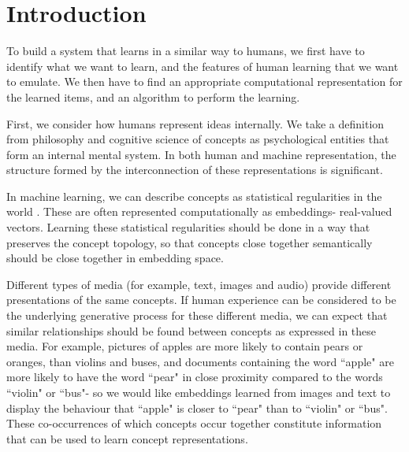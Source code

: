 \chapter{Introduction}

To build a system that learns in a similar way to humans, we first have to identify what we want to learn, and the features of human learning that we want to emulate. We then have to find an appropriate computational representation for the learned items, and an algorithm to perform the learning. 

First, we consider how humans represent ideas internally. We take a definition from philosophy \cite{stanfordconcepts}  and cognitive science  \cite{Pinker2007} of concepts as psychological entities that form an internal mental system. In both human and machine representation, the structure formed by the interconnection of these representations is significant. 


In machine learning, we can describe concepts as statistical regularities in the world \cite{RoadsLoveNatureMachineIntelligence}. These are often represented computationally as embeddings- real-valued vectors. Learning these statistical regularities should be done in a way that preserves the concept topology, so that concepts close together semantically should be close together in embedding space. 

Different types of media (for example, text, images and audio) provide different presentations of the same concepts. If human experience can be considered to be the underlying generative process for these different media, we can expect that similar relationships should be found between concepts as expressed in these media. For example, pictures of apples are more likely to contain pears or oranges, than violins and buses, and documents containing the word ``apple" are more likely to have the word ``pear" in close proximity compared to the words ``violin" or ``bus"- so we would like embeddings learned from images and text to display the behaviour that ``apple" is closer to ``pear" than to ``violin" or ``bus". These co-occurrences of which concepts occur together constitute information that can be used to learn concept representations. 

